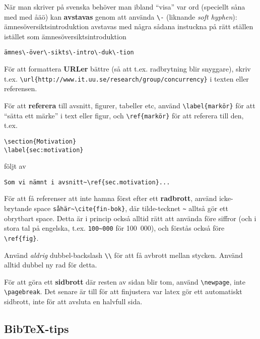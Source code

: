 \documentclass[a4paper,12pt]{article}
\begin{document}
När man skriver på svenska behöver man ibland ``visa'' var ord (speciellt såna med med åäö) kan \textbf{avstavas} genom att använda \verb|\-| (liknande \textit{soft hyphen}): ämnesöversiktsintroduktion avstavas med några sådana instuckna på rätt ställen istället som ämnes\-över\-sikts\-intro\-duk\-tion

\begin{verbatim}
ämnes\-över\-sikts\-intro\-duk\-tion
\end{verbatim}

För att formattera \textbf{URLer} bättre (så att t.ex. radbrytning blir snyggare), skriv t.ex. \verb|\url{http://www.it.uu.se/research/group/concurrency}| i texten eller referensen.

För att \textbf{referera} till avsnitt, figurer, tabeller etc, använd \verb|\label{markör}| för att ``sätta ett märke'' i text eller figur, och \verb|\ref{markör}| för att referera till den, t.ex.
\begin{verbatim}
\section{Motivation}
\label{sec:motivation}
\end{verbatim}

följt av
\begin{verbatim}
Som vi nämnt i avsnitt~\ref{sec.motivation}...
\end{verbatim}

För att få referenser att inte hamna först efter ett \textbf{radbrott}, använd icke-brytande space \verb|såhär~\cite{fin-bok}|, där tilde-tecknet \verb|~| alltså gör ett obrytbart space. Detta är i princip också alltid rätt att använda före siffror (och i stora tal på engelska, t.ex. \verb|100~000| för 100~000), och förstås också före \verb|\ref{fig}|.

Använd \emph{aldrig} dubbel-backslash \verb|\\| för att få avbrott mellan stycken. Använd alltid dubbel ny rad för detta.

För att göra ett \textbf{sidbrott} där resten av sidan blir tom, använd \verb|\newpage|, inte \verb|\pagebreak|. Det senare är till för att finjustera var latex gör ett automatiskt sidbrott, inte för att avsluta en halvfull sida.

\subsection{Bib\TeX-tips}
\end{document}
